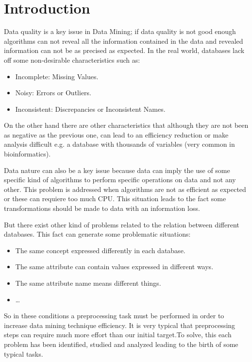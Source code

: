 \section{Introduction}
Data quality is a key issue in Data Mining; if data quality is not good
enough algorithms can not reveal all the information contained in the data
and revealed information can not be as precised as expected. In the real world,
databases lack off some non-desirable characteristics such as:

\begin{itemize}
    \item   Incomplete: Missing Values.
    \item   Noisy: Errors or Outliers.
    \item   Inconsistent: Discrepancies or Inconsistent Names.
\end{itemize}

On the other hand there are other characteristics that although they are not been
as negative as the previous one, can lead to an efficiency reduction or 
make analysis difficult e.g. a database with thousands of variables
(very common in bioinformatics).

Data nature can also be a key issue because data can imply the use of 
some specific kind of algorithms to perform specific operations on data and
not any other. This problem is addressed when algorithms are not as efficient as
expected or these can requiere too much CPU. This situation leads to the fact some 
transformations should be made to data with an information loss.

But there exist other kind of problems related to the relation between 
different databases. This fact can generate some problematic situations:
\begin{itemize}
    \item   The same concept expressed differently in each database.
    \item   The same attribute can contain values expressed in different ways.
    \item   The same attribute name means different things.
    \item   \ldots
\end{itemize}

So in these conditions a preprocessing task must be performed in order to increase
data mining technique efficiency. It is very typical that preprocessing steps can
require much more effort than our initial target.To solve, this each problem has 
been identified, studied and analyzed leading to the birth of some typical tasks.

